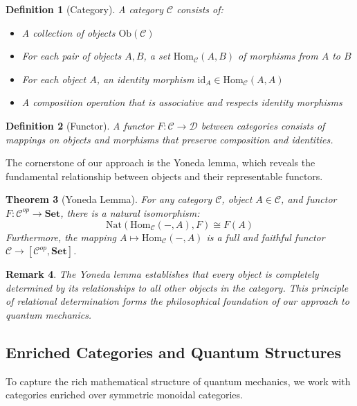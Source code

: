 \documentclass[12pt,a4paper]{article}
\newtheorem{theorem}{Theorem}[section]
\newtheorem{definition}[theorem]{Definition}
\newtheorem{remark}[theorem]{Remark}
\newcommand{\Hom}{\mathrm{Hom}}
\newcommand{\id}{\mathrm{id}}
\newcommand{\Set}{\mathbf{Set}}
\begin{document}
\begin{definition}[Category]
A category $\mathcal{C}$ consists of:
\begin{itemize}
\item A collection of objects $\text{Ob}(\mathcal{C})$
\item For each pair of objects $A, B$, a set $\Hom_{\mathcal{C}}(A, B)$ of morphisms from $A$ to $B$
\item For each object $A$, an identity morphism $\id_A \in \Hom_{\mathcal{C}}(A, A)$
\item A composition operation that is associative and respects identity morphisms
\end{itemize}
\end{definition}

\begin{definition}[Functor]
A functor $F: \mathcal{C} \to \mathcal{D}$ between categories consists of mappings on objects and morphisms that preserve composition and identities.
\end{definition}

The cornerstone of our approach is the Yoneda lemma, which reveals the fundamental relationship between objects and their representable functors.

\begin{theorem}[Yoneda Lemma]
For any category $\mathcal{C}$, object $A \in \mathcal{C}$, and functor $F: \mathcal{C}^{op} \to \Set$, there is a natural isomorphism:
\[
\text{Nat}(\Hom_{\mathcal{C}}(-, A), F) \cong F(A)
\]
Furthermore, the mapping $A \mapsto \Hom_{\mathcal{C}}(-, A)$ is a full and faithful functor $\mathcal{C} \to [\mathcal{C}^{op}, \Set]$.
\end{theorem}

\begin{remark}
The Yoneda lemma establishes that every object is completely determined by its relationships to all other objects in the category. This principle of relational determination forms the philosophical foundation of our approach to quantum mechanics.
\end{remark}

\subsection{Enriched Categories and Quantum Structures}

To capture the rich mathematical structure of quantum mechanics, we work with categories enriched over symmetric monoidal categories.
\end{document}
